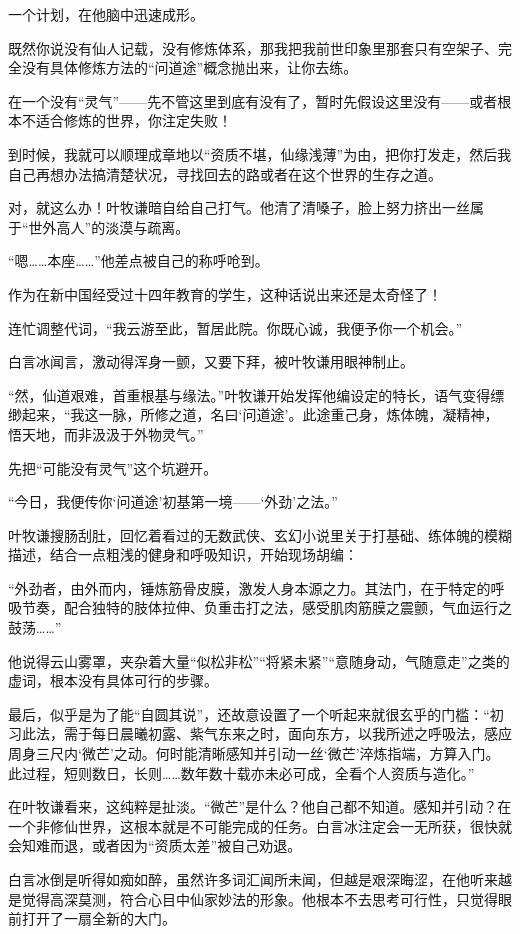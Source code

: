 一个计划，在他脑中迅速成形。

既然你说没有仙人记载，没有修炼体系，那我把我前世印象里那套只有空架子、完全没有具体修炼方法的“问道途”概念抛出来，让你去练。

在一个没有“灵气”——先不管这里到底有没有了，暂时先假设这里没有——或者根本不适合修炼的世界，你注定失败！

到时候，我就可以顺理成章地以“资质不堪，仙缘浅薄”为由，把你打发走，然后我自己再想办法搞清楚状况，寻找回去的路或者在这个世界的生存之道。

对，就这么办！叶牧谦暗自给自己打气。他清了清嗓子，脸上努力挤出一丝属于“世外高人”的淡漠与疏离。

“嗯……本座……”他差点被自己的称呼呛到。

作为在新中国经受过十四年教育的学生，这种话说出来还是太奇怪了！

连忙调整代词，“我云游至此，暂居此院。你既心诚，我便予你一个机会。”

白言冰闻言，激动得浑身一颤，又要下拜，被叶牧谦用眼神制止。

“然，仙道艰难，首重根基与缘法。”叶牧谦开始发挥他编设定的特长，语气变得缥缈起来，“我这一脉，所修之道，名曰‘问道途’。此途重己身，炼体魄，凝精神，悟天地，而非汲汲于外物灵气。”

先把“可能没有灵气”这个坑避开。

“今日，我便传你‘问道途’初基第一境——‘外劲’之法。”

叶牧谦搜肠刮肚，回忆着看过的无数武侠、玄幻小说里关于打基础、练体魄的模糊描述，结合一点粗浅的健身和呼吸知识，开始现场胡编：

“外劲者，由外而内，锤炼筋骨皮膜，激发人身本源之力。其法门，在于特定的呼吸节奏，配合独特的肢体拉伸、负重击打之法，感受肌肉筋膜之震颤，气血运行之鼓荡……”

他说得云山雾罩，夹杂着大量“似松非松”“将紧未紧”“意随身动，气随意走”之类的虚词，根本没有具体可行的步骤。

最后，似乎是为了能“自圆其说”，还故意设置了一个听起来就很玄乎的门槛：“初习此法，需于每日晨曦初露、紫气东来之时，面向东方，以我所述之呼吸法，感应周身三尺内‘微芒’之动。何时能清晰感知并引动一丝‘微芒’淬炼指端，方算入门。此过程，短则数日，长则……数年数十载亦未必可成，全看个人资质与造化。”

在叶牧谦看来，这纯粹是扯淡。“微芒”是什么？他自己都不知道。感知并引动？在一个非修仙世界，这根本就是不可能完成的任务。白言冰注定会一无所获，很快就会知难而退，或者因为“资质太差”被自己劝退。

白言冰倒是听得如痴如醉，虽然许多词汇闻所未闻，但越是艰深晦涩，在他听来越是觉得高深莫测，符合心目中仙家妙法的形象。他根本不去思考可行性，只觉得眼前打开了一扇全新的大门。

